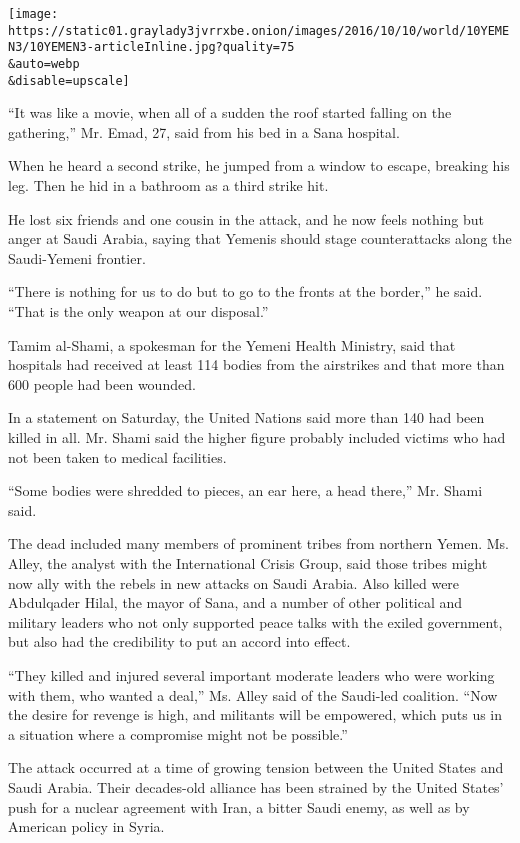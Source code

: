 \texttt{[image: https://static01.graylady3jvrrxbe.onion/images/2016/10/10/world/10YEMEN3/10YEMEN3-articleInline.jpg?quality=75\\\&auto=webp\\\&disable=upscale]}

``It was like a movie, when all of a sudden the roof started falling on
the gathering,'' Mr. Emad, 27, said from his bed in a Sana hospital.

When he heard a second strike, he jumped from a window to escape,
breaking his leg. Then he hid in a bathroom as a third strike hit.

He lost six friends and one cousin in the attack, and he now feels
nothing but anger at Saudi Arabia, saying that Yemenis should stage
counterattacks along the Saudi-Yemeni frontier.

``There is nothing for us to do but to go to the fronts at the border,''
he said. ``That is the only weapon at our disposal.''

Tamim al-Shami, a spokesman for the Yemeni Health Ministry, said that
hospitals had received at least 114 bodies from the airstrikes and that
more than 600 people had been wounded.

In a statement on Saturday, the United Nations said more than 140 had
been killed in all. Mr. Shami said the higher figure probably included
victims who had not been taken to medical facilities.

``Some bodies were shredded to pieces, an ear here, a head there,'' Mr.
Shami said.

The dead included many members of prominent tribes from northern Yemen.
Ms. Alley, the analyst with the International Crisis Group, said those
tribes might now ally with the rebels in new attacks on Saudi Arabia.
Also killed were Abdulqader Hilal, the mayor of Sana, and a number of
other political and military leaders who not only supported peace talks
with the exiled government, but also had the credibility to put an
accord into effect.

``They killed and injured several important moderate leaders who were
working with them, who wanted a deal,'' Ms. Alley said of the Saudi-led
coalition. ``Now the desire for revenge is high, and militants will be
empowered, which puts us in a situation where a compromise might not be
possible.''

The attack occurred at a time of growing tension between the United
States and Saudi Arabia. Their decades-old alliance has been strained by
the United States' push for a nuclear agreement with Iran, a bitter
Saudi enemy, as well as by American policy in Syria.

